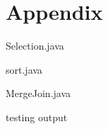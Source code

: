 \documentclass[a4paper,10pt,titlepage]{report}
\begin{document}
\section{Appendix}
Selection.java


sort.java


MergeJoin.java


testing output

\end{document}
